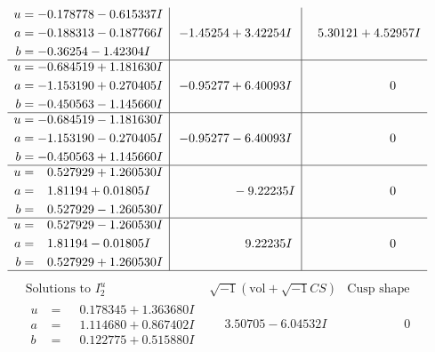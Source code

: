 \documentclass[1p]{elsarticle_modified}
\theoremstyle{definition}
\newcommand{\I}{\sqrt{-1}}
\begin{document}
$$\begin{array}{c|c|c}
\begin{aligned}
u &= -0.178778 - 0.615337 I \\
a &= -0.188313 - 0.187766 I \\
b &= -0.36254 - 1.42304 I\end{aligned}
 & -1.45254 + 3.42254 I & \phantom{-}5.30121 + 4.52957 I \\ \hline\begin{aligned}
u &= -0.684519 + 1.181630 I \\
a &= -1.153190 + 0.270405 I \\
b &= -0.450563 - 1.145660 I\end{aligned}
 & -0.95277 + 6.40093 I & \phantom{-0.000000 } 0 \\ \hline\begin{aligned}
u &= -0.684519 - 1.181630 I \\
a &= -1.153190 - 0.270405 I \\
b &= -0.450563 + 1.145660 I\end{aligned}
 & -0.95277 - 6.40093 I & \phantom{-0.000000 } 0 \\ \hline\begin{aligned}
u &= \phantom{-}0.527929 + 1.260530 I \\
a &= \phantom{-}1.81194 + 0.01805 I \\
b &= \phantom{-}0.527929 - 1.260530 I\end{aligned}
 & \phantom{-0.000000 } -9.22235 I & \phantom{-0.000000 } 0 \\ \hline\begin{aligned}
u &= \phantom{-}0.527929 - 1.260530 I \\
a &= \phantom{-}1.81194 - 0.01805 I \\
b &= \phantom{-}0.527929 + 1.260530 I\end{aligned}
 & \phantom{-0.000000 -}9.22235 I & \phantom{-0.000000 } 0\\
 \hline 
 \end{array}$$\newpage$$\begin{array}{c|c|c}  
\text{Solutions to }I^u_{2}& \I (\text{vol} + \sqrt{-1}CS) & \text{Cusp shape}\\
 \hline 
\begin{aligned}
u &= \phantom{-}0.178345 + 1.363680 I \\
a &= \phantom{-}1.114680 + 0.867402 I \\
b &= \phantom{-}0.122775 + 0.515880 I\end{aligned}
 & \phantom{-}3.50705 - 6.04532 I & \phantom{-0.000000 } 0 \\ \hline\begin{aligned}

\end{aligned}
\end{array}$$
\end{document}
